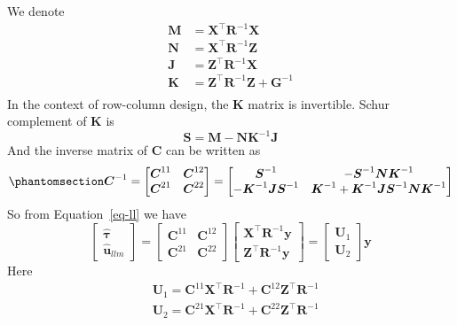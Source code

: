 \documentclass[
  a4paper,
  oneside,
  openany,
  12pt,
  onecolumn]{book}
\theoremstyle{plain}
\theoremstyle{definition}
\theoremstyle{remark}
\begin{document}
We denote \[\begin{aligned}
\boldsymbol{M} &= \boldsymbol{X}^\top \boldsymbol{R}^{-1} \boldsymbol{X}\\
\boldsymbol{N} &= \boldsymbol{X}^\top \boldsymbol{R}^{-1} \boldsymbol{Z}\\
\boldsymbol{J} &= \boldsymbol{Z}^\top \boldsymbol{R}^{-1} \boldsymbol{X}\\
\boldsymbol{K} &= \boldsymbol{Z}^\top \boldsymbol{R}^{-1} \boldsymbol{Z} + \boldsymbol{G}^{-1}\\
\end{aligned}\] In the context of row-column design, the
\(\boldsymbol{K}\) matrix is invertible. Schur complement of
\(\boldsymbol{K}\) is \[
\boldsymbol{S} = \boldsymbol{M} - \boldsymbol{N} \boldsymbol{K}^{-1} \boldsymbol{J}
\] And the inverse matrix of \(\boldsymbol{C}\) can be written as
\begin{equation}\phantomsection\label{eq-iv}{
\boldsymbol{C}^{-1}=
\begin{bmatrix}
\boldsymbol{C}^{11} & \boldsymbol{C}^{12} \\
\boldsymbol{C}^{21} & \boldsymbol{C}^{22}
\end{bmatrix}=
\begin{bmatrix}
\boldsymbol{S}^{-1} & -\boldsymbol{S}^{-1} \boldsymbol{N} \boldsymbol{K}^{-1} \\
-\boldsymbol{K}^{-1} \boldsymbol{J} \boldsymbol{S}^{-1} & \boldsymbol{K}^{-1} + \boldsymbol{K}^{-1} \boldsymbol{J} \boldsymbol{S}^{-1} \boldsymbol{N} \boldsymbol{K}^{-1}
\end{bmatrix}
}\end{equation} So from Equation~\ref{eq-ll} we have \[
\begin{bmatrix}
\hat{\boldsymbol{\tau}} \\
\hat{\boldsymbol{u}}_{llm}
\end{bmatrix}
=
\begin{bmatrix}
\boldsymbol{C}^{11} & \boldsymbol{C}^{12} \\
\boldsymbol{C}^{21} & \boldsymbol{C}^{22}
\end{bmatrix}
\begin{bmatrix}
\boldsymbol{X}^\top\boldsymbol{R}^{-1}\boldsymbol{y}\\
\boldsymbol{Z}^\top\boldsymbol{R}^{-1}\boldsymbol{y}
\end{bmatrix}
=
\begin{bmatrix}
\boldsymbol{U}_1\\
\boldsymbol{U}_2
\end{bmatrix}\boldsymbol{y}
\] Here \[\begin{aligned}
&\boldsymbol{U}_1 = \boldsymbol{C}^{11}\boldsymbol{X}^\top\boldsymbol{R}^{-1}+\boldsymbol{C}^{12}\boldsymbol{Z}^\top\boldsymbol{R}^{-1}\\
&\boldsymbol{U}_2 = \boldsymbol{C}^{21}\boldsymbol{X}^\top\boldsymbol{R}^{-1}+\boldsymbol{C}^{22}\boldsymbol{Z}^\top\boldsymbol{R}^{-1}
\end{aligned}\]
\end{document}
